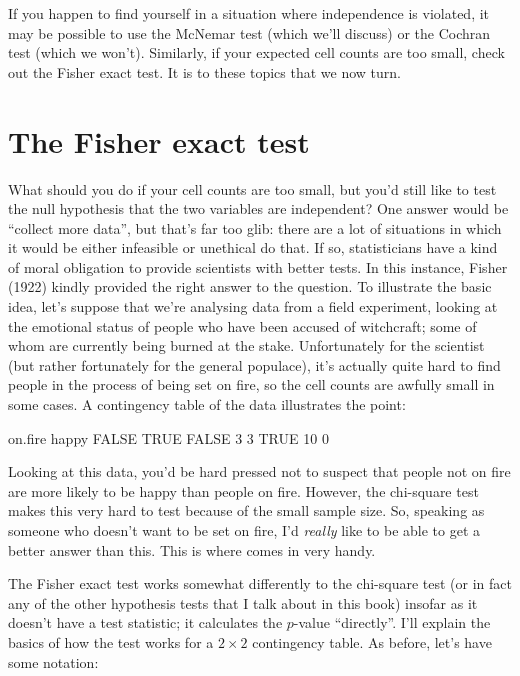 \noindent
If you happen to find yourself in a situation where independence is violated, it may be possible to use the McNemar test (which we'll discuss) or the Cochran test (which we won't). Similarly, if your expected cell counts are too small, check out the Fisher exact test. It is to these topics that we now turn. 


\section{The Fisher exact test~\label{sec:fisherexacttest}}

What should you do if your cell counts are too small, but you'd still like to test the null hypothesis that the two variables are independent? One answer would be ``collect more data'', but that's far too glib: there are a lot of situations in which it would be either infeasible or unethical do that. If so, statisticians have a kind of moral obligation to provide scientists with better tests. In this instance, Fisher (1922) kindly provided the right answer to the question. To illustrate the basic idea, let's suppose that we're analysing data from a field experiment, looking at the emotional status of people who have been accused of witchcraft; some of whom are currently being burned at the stake. Unfortunately for the scientist (but rather fortunately for the general populace), it's actually quite hard to find people in the process of being set on fire, so the cell counts are awfully small in some cases. A contingency table of the  data illustrates the point:

\begin{rblock1}
       on.fire
happy   FALSE TRUE
  FALSE     3    3
  TRUE     10    0
\end{rblock1}

Looking at this data, you'd be hard pressed not to suspect that people not on fire are more likely to be happy than people on fire. However, the chi-square test makes this very hard to test because of the small sample size. So, speaking as someone who doesn't want to be set on fire, I'd {\it really} like to be able to get a better answer than this. This is where  \cite{Fisher1922} comes in very handy. 

The Fisher exact test works somewhat differently to the chi-square test (or in fact any of the other hypothesis tests that I talk about in this book) insofar as it doesn't have a test statistic; it calculates the $p$-value ``directly''. I'll explain the basics of how the test works for a $2 \times 2$ contingency table. As before, let's have some notation: 

